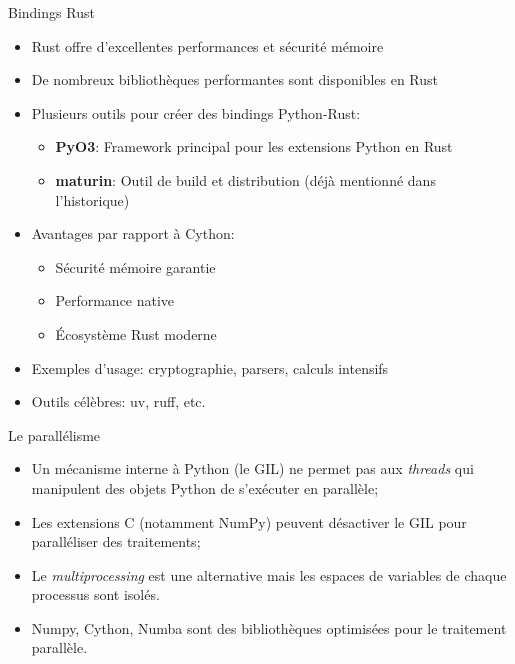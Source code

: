 \documentclass[dvipsnames]{beamer}
\begin{document}
\begin{frame}
    [fragile]{Bindings Rust}
    \begin{itemize}
        \item Rust offre d'excellentes performances et sécurité mémoire
        \item De nombreux bibliothèques performantes sont disponibles en Rust
        \item Plusieurs outils pour créer des bindings Python-Rust:
              \begin{itemize}
                  \item \textbf{PyO3}: Framework principal pour les extensions Python en Rust
                  \item \textbf{maturin}: Outil de build et distribution (déjà mentionné dans l'historique)
              \end{itemize}
        \item Avantages par rapport à Cython:
              \begin{itemize}
                  \item Sécurité mémoire garantie
                  \item Performance native
                  \item Écosystème Rust moderne
              \end{itemize}
        \item Exemples d'usage: cryptographie, parsers, calculs intensifs
        \item Outils célèbres: uv, ruff, etc.
    \end{itemize}
\end{frame}

\begin{frame}
    [fragile]{Le parallélisme}
    \begin{itemize}
        \item Un mécanisme interne à Python (le GIL) ne permet pas aux
              \emph{threads} qui manipulent des objets Python de s'exécuter en
              parallèle;\\
              \mbox{}\hfill\PointingHand{} \quad\mbox{}
        \item Les extensions C (notamment NumPy) peuvent désactiver le GIL pour
              paralléliser des traitements;
        \item Le \emph{multiprocessing} est une alternative mais les espaces de
              variables de chaque processus sont isolés.
              \vspace{1em}
        \item Numpy, Cython, Numba sont des bibliothèques optimisées pour le
              traitement parallèle.
    \end{itemize}

\end{frame}
\end{document}
